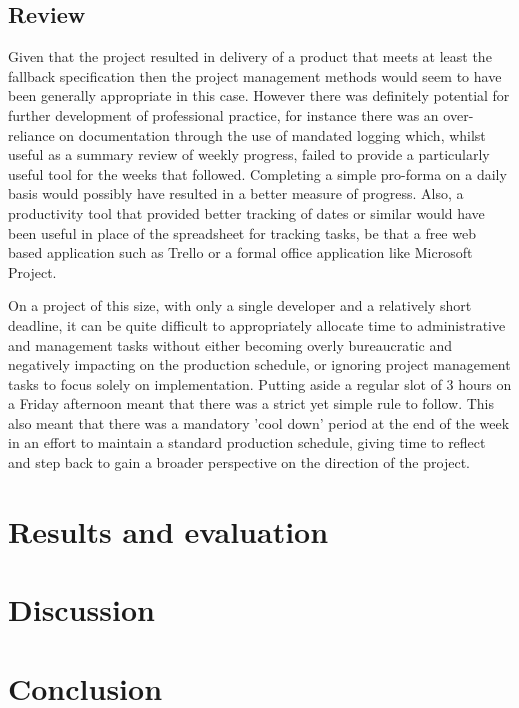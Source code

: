 \documentclass[twoside]{bhamthesis}
\begin{document}
\subsection{Review}
Given that the project resulted in delivery of a product that meets at least the fallback specification then the project management methods would seem to have been generally appropriate in this case. However there was definitely potential for further development of professional practice, for instance there was an over-reliance on documentation through the use of mandated logging which, whilst useful as a summary review of weekly progress, failed to provide a particularly useful tool for the weeks that followed. Completing a simple pro-forma on a daily basis would possibly have resulted in a better measure of progress. Also, a productivity tool that provided better tracking of dates or similar would have been useful in place of the spreadsheet for tracking tasks, be that a free web based application such as Trello or a formal office application like Microsoft Project.

On a project of this size, with only a single developer and a relatively short deadline, it can be quite difficult to appropriately allocate time to administrative and management tasks without either becoming overly bureaucratic and negatively impacting on the production schedule, or ignoring project management tasks to focus solely on implementation. Putting aside a regular slot of 3 hours on a Friday afternoon meant that there was a strict yet simple rule to follow. This also meant that there was a mandatory 'cool down' period at the end of the week in an effort to maintain a standard production schedule, giving time to reflect and step back to gain a broader perspective on the direction of the project.





\section{Results and evaluation}



\section{Discussion}



\section{Conclusion}
\end{document}
